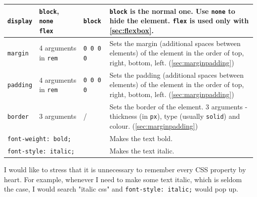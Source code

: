 \begin{table}[H]
\begin{tabular}{|m{6.5em}|m{5em}|m{5.5em}|m{16em}|}
        \texttt{display} &
        \makecell[lb]{
            \texttt{block}, \\
            \texttt{none} \\
            \texttt{flex}
        } & 
        \texttt{block} &
        \texttt{block} is the normal one. Use \texttt{none} to hide the element. \texttt{flex} is used only with \cref{sec:flexbox}.
        \\ \hline
        
        \texttt{margin} &
        4 arguments in \texttt{rem} & 
        \texttt{0 0 0 0} &
        Sets the margin (additional spaces between elements) of the element in the order of top, right, bottom, left. (\cref{sec:marginpadding})
        \\ \hline
        
        \texttt{padding} &
        4 arguments in \texttt{rem} & 
        \texttt{0 0 0 0} &
        Sets the padding (additional spaces between elements) of the element in the order of top, right, bottom, left.  (\cref{sec:marginpadding})
        \\ \hline
        
        \texttt{border} &
        3 arguments &
        / &
        Sets the border of the element. 3 arguments - thickness (in \texttt{px}), type (usually \texttt{solid}) and colour. (\cref{sec:marginpadding})
        \\ \hline
        
        \multicolumn{3}{|l|}{\texttt{font-weight: bold;}} &
        Makes the text bold.
        \\ \hline
        
        \multicolumn{3}{|l|}{\texttt{font-style: italic;}} &
        Makes the text italic.
        \\ \hline
        
    \end{tabular}
\end{table}

I would like to stress that it is unnecessary to remember every CSS property by heart. For example, whenever I need to make some text italic, which is seldom the case, I would search "italic css" and \texttt{font-style: italic;} would pop up. 


